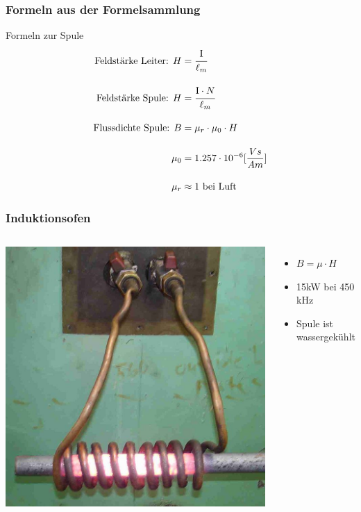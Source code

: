 \begin{frame}
    \frametitle{Formeln aus der Formelsammlung}
    \begin{block}{Formeln zur Spule}
      \begin{align*}
        \text{Feldstärke Leiter: } H &= \cfrac{\mathrm{I}}{\ell_m} \\[1em]
    	\text{Feldstärke Spule: } H &= \cfrac{\mathrm{I} \cdot N}{\ell_m} \\[1em]
	\text{Flussdichte Spule: } B &= \mu_r \cdot \mu_0 \cdot H \\[1em]
    	\mu_0 &= 1.257 \cdot 10^{-6}[\frac{Vs}{Am}] \\[1em]
	\mu_r &\approx 1 \text{ bei Luft}
     \end{align*}
   \end{block}
\end{frame}

\begin{frame}
  \frametitle{Induktionsofen}
  \begin{columns}[c]
    \includegraphics[width=\textwidth,height=.85\textheight,keepaspectratio]{a08/Induction_heating_of_bar_crop.jpg}\\
    {\tiny \hyperlink{refs}{\cite{wm}}} \\[1em]
    \begin{itemize}
	    \item $B = \mu \cdot H$ %
        \item 15kW bei 450 kHz
      \item Spule ist wassergekühlt
    \end{itemize}
  \end{columns}
\end{frame}

